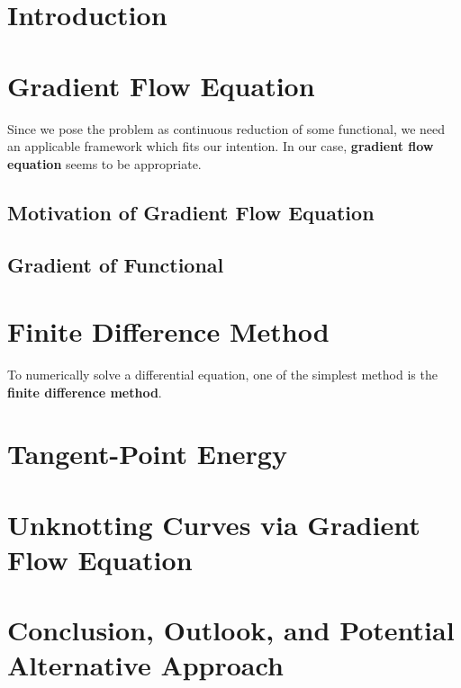 \documentclass[a4paper, 12pt]{article}
\numberwithin{equation}{section}
\numberwithin{figure}{section}
\theoremstyle{definition}
\theoremstyle{plain}
\theoremstyle{plain}
\theoremstyle{plain}
\theoremstyle{remark}
\numberwithin{theorem}{section}
\theoremstyle{definition}
\begin{document}



\tableofcontents

\section{Introduction}


\section{Gradient Flow Equation}
Since we pose the problem as continuous reduction of some functional,
we need an applicable framework which fits our intention.
In our case, \textbf{gradient flow equation} seems to be appropriate.
\subsection{Motivation of Gradient Flow Equation}
\label{sct: Motivation of Gradient Flow Equation}

\subsection{Gradient of Functional}


\section{Finite Difference Method}
To numerically solve a differential equation,
one of the simplest method is the \textbf{finite difference method}.\cite{nspde}


\section{Tangent-Point Energy}


\section{Unknotting Curves via Gradient Flow Equation}


\section{Conclusion, Outlook, and Potential Alternative Approach}

\end{document}
